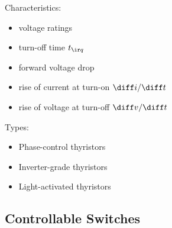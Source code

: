\documentclass[fs, footer]{latex4ei}
\begin{document}
\begin{multicols*}{4}
{

Characteristics:
\begin{itemize}
	\item voltage ratings
	\item turn-off time $t_{\ir q}$
	\item forward voltage drop
	\item rise of current at turn-on $\diff i / \diff t$
	\item rise of voltage at turn-off $\diff v / \diff t$
\end{itemize}

Types:
\begin{itemize}
	\item Phase-control thyristors
	\item Inverter-grade thyristors
	\item Light-activated thyristors
\end{itemize}
}
\subsection{Controllable Switches} 
\end{multicols*}

\end{document}
